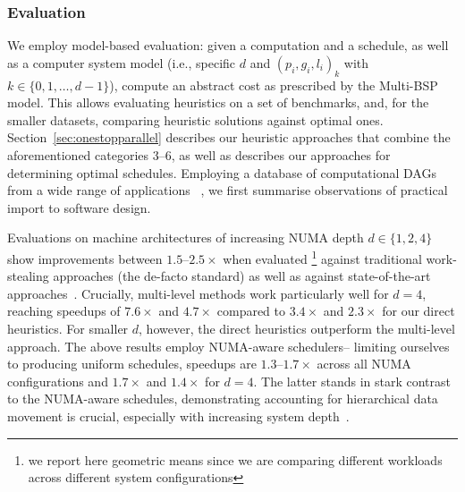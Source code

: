 \documentclass[oneside,reqno, a4paper]{amsart}
\numberwithin{equation}{section}
\begin{document}
\subsubsection*{Evaluation}

We employ model-based evaluation:
given a computation and a schedule,
as well as a computer system model (i.e., specific $d$ and $(p_i,g_i,l_i)_k$ with $k\in{\{0,1,\ldots,d-1\}}$),
compute an abstract cost as prescribed by the Multi-BSP model.
This allows evaluating heuristics on a set of benchmarks,
and,
for the smaller datasets,
comparing heuristic solutions against optimal ones.
Section~\ref{sec:onestopparallel} describes our heuristic approaches that combine the aforementioned categories $3$--$6$,
as well as describes our approaches for determining optimal schedules.
Employing a database of computational DAGs from a wide range of applications%
~\cite{HyperDAG_DB,BSP_algos_opdas},
we first summarise observations of practical import to software design.

Evaluations on machine architectures of increasing NUMA depth $d\in\{1,2,4\}$
show improvements between $1.5$--$2.5\times$ when evaluated%
\footnote{we report here geometric means since we are comparing different workloads across different system configurations}
against traditional work-stealing approaches (the de-facto standard)
as well as against state-of-the-art approaches~\cite{blumofe95,zarebavani2022hdagg}.
Crucially,
multi-level methods work particularly well for $d=4$,
reaching speedups of $7.6\times$ and $4.7\times$ %
compared to $3.4\times$ and $2.3\times$ for our direct heuristics.
For smaller $d$, however, the direct heuristics outperform the multi-level approach.
The above results employ NUMA-aware schedulers--
limiting ourselves to producing uniform schedules,
speedups are $1.3$--$1.7\times$ across all NUMA configurations and $1.7\times$ and $1.4\times$ for $d=4$.
The latter stands in stark contrast to the NUMA-aware schedules,
demonstrating accounting for hierarchical data movement is crucial,
especially with increasing system depth~\cite{BSP_algos_opdas}.
\end{document}
